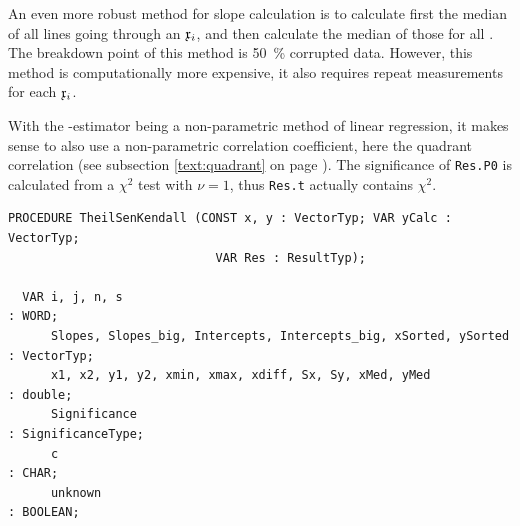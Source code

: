 \begin{refsection}
An even more robust method for slope calculation is to calculate first the median of all lines going through an \(\mathfrak{x}_i \), and then calculate the median of those for all   \parencite{Sie-82}. The breakdown point of this method is \SI{50}{\%} corrupted data. However, this method is computationally more expensive, it also requires repeat measurements for each \(\mathfrak{x}_i \).

With the -estimator being a non-parametric method of linear regression, it makes sense to also use a non-parametric correlation coefficient, here the quadrant correlation (see subsection \ref{text:quadrant} on page \pageref{text:quadrant}). The significance of \texttt{Res.P0} is calculated from a \(\chi^2 \) test with \(\nu = 1 \), thus \texttt{Res.t} actually contains \(\chi^2 \).

\begin{lstlisting}[caption=Theil-Sen-Kendall-estimator]
  PROCEDURE TheilSenKendall (CONST x, y : VectorTyp; VAR yCalc : VectorTyp;
                             VAR Res : ResultTyp);

  VAR i, j, n, s                                                       : WORD;
      Slopes, Slopes_big, Intercepts, Intercepts_big, xSorted, ySorted : VectorTyp;
      x1, x2, y1, y2, xmin, xmax, xdiff, Sx, Sy, xMed, yMed            : double;
      Significance                                                     : SignificanceType;
      c                                                                : CHAR;
      unknown                                                          : BOOLEAN;


\end{lstlisting}
\end{refsection}
